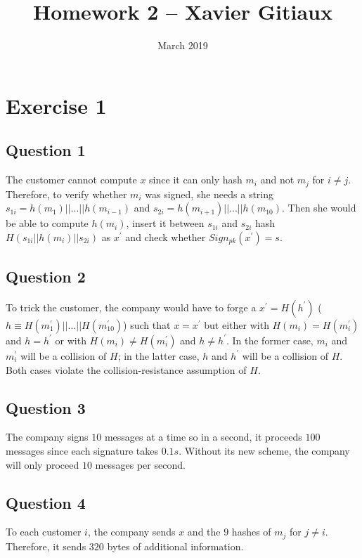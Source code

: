 \documentclass{article}
\title{Homework 2 -- Xavier Gitiaux}
\author{}
\date{March 2019}
\begin{document}
\maketitle

\section{Exercise 1}
\subsection{Question 1}
The customer cannot compute $x$ since it can only hash $m_{i}$ and not $m_{j}$ for $i\neq j$.  Therefore, to verify whether $m_{i}$ was signed, she needs a string $s_{1i}=h(m_{1})||...||h(m_{i-1})$ and $s_{2i}=h(m_{i+1})||...||h(m_{10})$. Then she would be able to compute $h(m_{i})$, insert it between $s_{1i}$  and $s_{2i}$ hash $H(s_{1i}||h(m_{i})||s_{2i})$ as $x^{'}$ and check whether $Sign_{pk}( x^{'})=s$. 

\subsection{Question 2}
To trick the customer, the company would have to forge a $x^{'}=H(h^{'})$ ($h\equiv H(m_{1}^{'})||...||H(m_{10}^{'})$) such that $x=x^{'}$ but either with $H(m_{i}) = H(m_{i}^{'})$ and $h=h^{'}$ or with $H(m_{i}) \neq H(m_{i}^{'})$ and $h\neq h^{'}$. In the former case, $m_{i}$ and $m_{i}^{'}$ will be a collision of $H$; in the latter case, $h$ and $h^{'}$ will be a collision of $H$. Both cases violate the collision-resistance assumption of $H$.

\subsection{Question 3}
The company signs $10$ messages at a time so in a second, it proceeds $100$ messages since each signature takes $0.1s$. Without its new scheme, the company will only proceed $10$ messages per second.

\subsection{Question 4}
To each customer $i$, the company sends $x$ and the $9$ hashes of $m_{j}$ for $j\neq i$. Therefore, it sends $320$ bytes of additional information.
\end{document}
